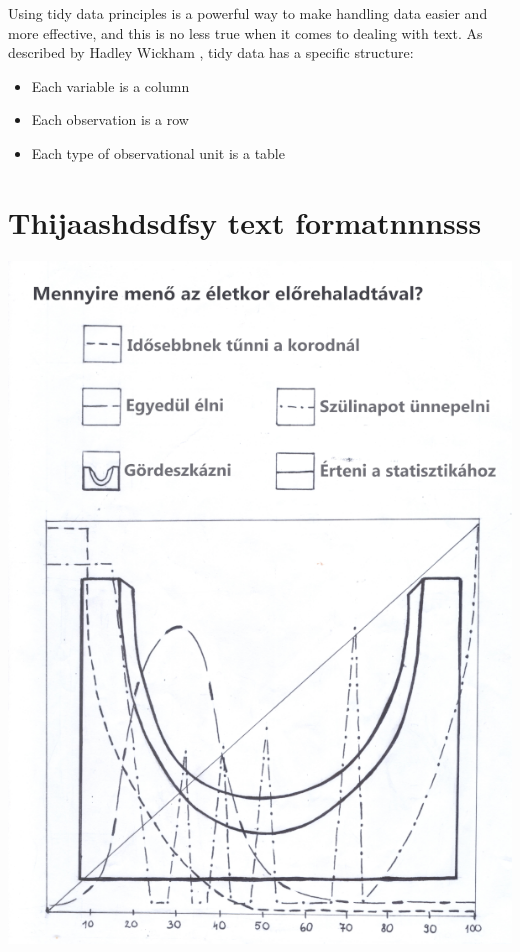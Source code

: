\documentclass[
]{book}
\providecommand{\tightlist}{%
  \setlength{\itemsep}{0pt}\setlength{\parskip}{0pt}}
\begin{document}
Using tidy data principles is a powerful way to make handling data easier and more effective, and this is no less true when it comes to dealing with text. As described by Hadley Wickham \citep{tidydata}, tidy data has a specific structure:

\begin{itemize}
\tightlist
\item
  Each variable is a column
\item
  Each observation is a row
\item
  Each type of observational unit is a table
\end{itemize}

\hypertarget{thijaashdsdfsy-text-formatnnnsss-1}{%
\chapter{Thijaashdsdfsy text formatnnnsss}\label{thijaashdsdfsy-text-formatnnnsss-1}}

\begin{center}\includegraphics[width=0.9\linewidth]{images/ch_09_small} \end{center}
\end{document}
